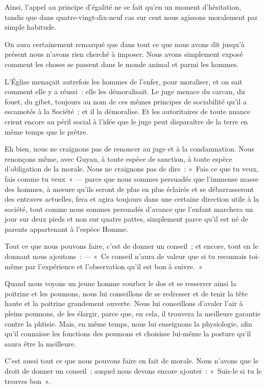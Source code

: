 \documentclass[french,twoside]{book} %
\begin{document}
Ainsi, l’appel au principe d’égalité ne se fait qu’en un moment d’hésitation, tandis que dans quatre-vingt-dix-neuf cas sur cent nous agissons moralement par simple habitude.\par
\bigbreak
\noindent On aura certainement remarqué que dans tout ce que nous avons dit jusqu’à présent nous n’avons rien cherché à imposer. Nous avons simplement exposé comment les choses se passent dans le monde animal et parmi les hommes.\par
L’Église menaçait autrefois les hommes de l’enfer, pour moraliser, et on sait comment elle y a réussi : elle les démoralisait. Le juge menace du carcan, du fouet, du gibet, toujours au nom de ces mêmes principes de sociabilité qu’il a escamotés à la Société ; et il la démoralise. Et les autoritaires de toute nuance crient encore au péril social à l’idée que le juge peut disparaître de la terre en même temps que le prêtre.\par
Eh bien, nous ne craignons pas de renoncer au juge et à la condamnation. Nous renonçons même, avec Guyau, à toute espèce de sanction, à toute espèce d’obligation de la morale. Nous ne craignons pas de dire : « Fais ce que tu veux, fais comme tu veux » — parce que nous sommes persuadés que l’immense masse des hommes, à mesure qu’ils seront de plus en plus éclairés et se débarrasseront des entraves actuelles, fera et agira toujours dans une certaine direction utile à la société, tout comme nous sommes persuadés d’avance que l’enfant marchera un jour sur deux pieds et non sur quatre pattes, simplement parce qu’il est né de parents appartenant à l’espèce Homme.\par
Tout ce que nous pouvons faire, c’est de donner un conseil ; et encore, tout en le donnant nous ajoutons : — « Ce conseil n’aura de valeur que si tu reconnais toi-même par l’expérience et l’observation qu’il est bon à suivre. »\par
Quand nous voyons un jeune homme courber le dos et se resserrer ainsi la poitrine et les poumons, nous lui conseillons de se redresser et de tenir la tête haute et la poitrine grandement ouverte. Nous lui conseillons d’avaler l’air à pleins poumons, de les élargir, parce que, en cela, il trouvera la meilleure garantie contre la phtisie. Mais, en même  temps, nous lui enseignons la physiologie, afin qu’il connaisse les fonctions des poumons et choisisse lui-même la posture qu’il saura être la meilleure.\par
C’est aussi tout ce que nous pouvons faire en fait de morale. Nous n’avons que le droit de donner un conseil ; auquel nous devons encore ajouter : « Suis-le si tu le trouves bon ».\par
\end{document}
